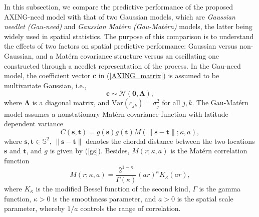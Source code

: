 \documentclass[aoas,preprint]{imsart}
\numberwithin{equation}{section}
\theoremstyle{plain}
\begin{document}
In this subsection, we compare the predictive performance of the proposed AXING-need model with that of two Gaussian models, which are \textit{Gaussian needlet (Gau-need)} and \textit{Gaussian Mat\'ern (Gau-Mat\'ern)} models, the latter being widely used in spatial statistics. The purpose of this comparison is to understand the effects of two factors on spatial predictive performance: Gaussian versus non-Gaussian, and 
a Mat\'ern covariance structure versus an oscillating one constructed through a needlet representation of the process. In the Gau-need model, the coefficient vector $\textbf{c}$ in (\ref{AXING_matrix}) is assumed to be multivariate Gaussian, i.e., 
$$\textbf{c} \sim \mathcal{N}(\textbf{0}, \bm{\Lambda}),$$
where $\bm{\Lambda}$ is a diagonal matrix, and $\mbox{Var}(c_{jk})=\sigma_j^2$ for all $j, k$.
The Gau-Mat\'ern model assumes a nonstationary Mat\'ern covariance function with latitude-dependent variance
$$C(\textbf{s}, \textbf{t})=g(\textbf{s})g(\textbf{t})M(\lVert \textbf{s}-\textbf{t} \rVert; \kappa, a),$$
where $\textbf{s}, \textbf{t}\in \mathbb{S}^2$, $\lVert \textbf{s}-\textbf{t} \rVert$ denotes the chordal distance between the two locations $\textbf{s}$ and $\textbf{t}$, and $g$ is given by (\ref{gs}). Besides, $M(r; \kappa, a)$ is the Mat\'ern correlation function
$$M(r; \kappa, a)=\frac{2^{1-\kappa}}{\Gamma(\kappa)}(ar)^{\kappa}K_{\kappa}(ar),$$
where $K_\kappa$ is the modified Bessel function of the second kind, $\Gamma$ is the gamma function, $\kappa > 0$ is the smoothness parameter, and $a > 0$ is the spatial scale parameter, whereby $1/a$ controls the range of correlation.
\end{document}
